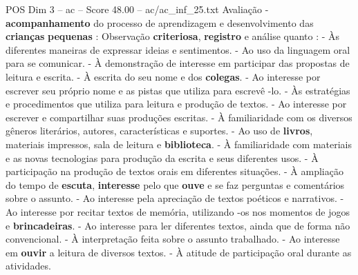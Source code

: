 \begin{textsample}{POS Dim 3 – ac – Score 48.00 – ac/ac\_inf\_25.txt}
Avaliação - \textbf{acompanhamento} do processo de aprendizagem e desenvolvimento das \textbf{crianças} \textbf{pequenas} : Observação \textbf{criteriosa}, \textbf{registro} e análise quanto : - Às diferentes maneiras de expressar ideias e sentimentos. - Ao uso da linguagem oral para se comunicar. - À demonstração de interesse em participar das propostas de leitura e escrita. - À escrita do seu nome e dos \textbf{colegas}. - Ao interesse por escrever seu próprio nome e as pistas que utiliza para escrevê -lo. - Às estratégias e procedimentos que utiliza para leitura e produção de textos. - Ao interesse por escrever e compartilhar suas produções escritas. - À familiaridade com os diversos gêneros literários, autores, características e suportes. - Ao uso de \textbf{livros}, materiais impressos, sala de leitura e \textbf{biblioteca}. - À familiaridade com materiais e as novas tecnologias para produção da escrita e seus diferentes usos. - À participação na produção de textos orais em diferentes situações. - À ampliação do tempo de \textbf{escuta}, \textbf{interesse} pelo que \textbf{ouve} e se faz perguntas e comentários sobre o assunto. - Ao interesse pela apreciação de textos poéticos e narrativos. - Ao interesse por recitar textos de memória, utilizando -os nos momentos de jogos e \textbf{brincadeiras}. - Ao interesse para ler diferentes textos, ainda que de forma não convencional. - À interpretação feita sobre o assunto trabalhado. - Ao interesse em \textbf{ouvir} a leitura de diversos textos. - À atitude de participação oral durante as atividades.

\end{textsample}
